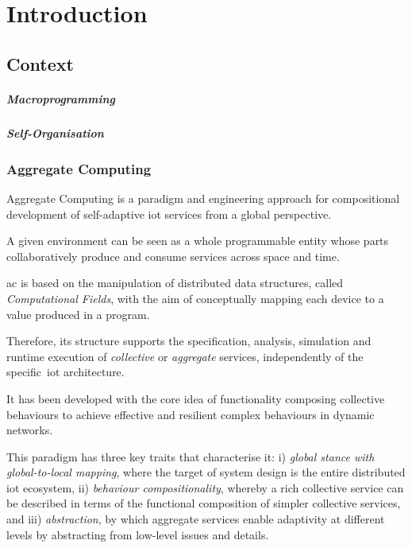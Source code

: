 
\chapter{Introduction}
\label{chap:introduction}
\section{Context}
\label{sec:context}

\paragraph{Macroprogramming}


\paragraph{Self-Organisation}

\subsection{Aggregate Computing}
\label{subsec:aggregate-computing}
Aggregate Computing is a paradigm and engineering approach for compositional development of self-adaptive \ac{iot} services from a global perspective.

A given environment can be seen as a whole programmable entity whose parts collaboratively produce and consume services
across space and time.

\ac{ac} is based on the manipulation of distributed data structures, called \textit{Computational Fields},
with the aim of conceptually mapping each device to a value produced in a program.

Therefore, its structure supports the specification, analysis, simulation and runtime execution of \textit{collective}
or \textit{aggregate} services, independently of the specific~\ac{iot} architecture.

It has been developed with the core idea of functionality composing collective behaviours to achieve effective and resilient
complex behaviours in dynamic networks.

This paradigm has three key traits that characterise it:
    i) \textit{global stance with global-to-local mapping}, where the target of system design is the entire distributed
        \ac{iot} ecosystem,
    ii) \textit{behaviour compositionality}, whereby a rich collective service can be described in terms of the functional
        composition of simpler collective services, and
    iii) \textit{abstraction}, by which aggregate services enable adaptivity at different levels by abstracting from low-level
        issues and details.

